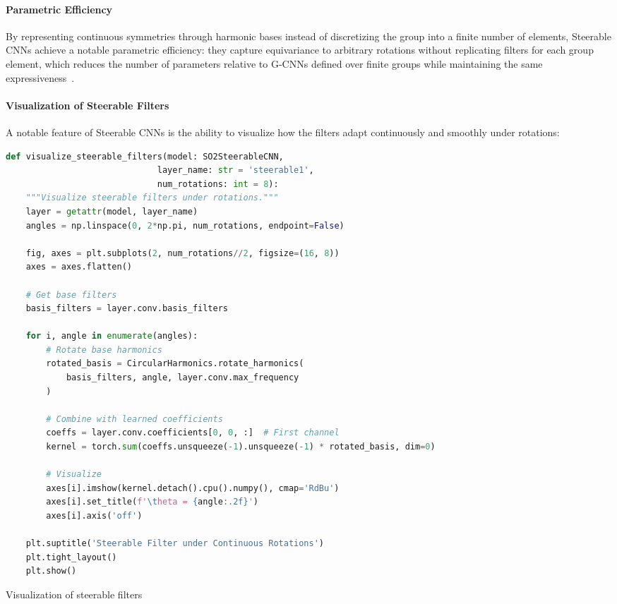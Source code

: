 \paragraph{Parametric Efficiency}

By representing continuous symmetries through harmonic bases instead of discretizing the group into a finite number of elements, Steerable CNNs achieve a notable parametric efficiency: they capture equivariance to arbitrary rotations without replicating filters for each group element, which reduces the number of parameters relative to G-CNNs defined over finite groups while maintaining the same expressiveness~\citep{weiler2019general}.

\paragraph{Visualization of Steerable Filters}

A notable feature of Steerable CNNs is the ability to visualize how the filters adapt continuously and smoothly under rotations:

\begin{listing}[h]
\begin{lstlisting}[language=Python]
def visualize_steerable_filters(model: SO2SteerableCNN,
                              layer_name: str = 'steerable1',
                              num_rotations: int = 8):
    """Visualize steerable filters under rotations."""
    layer = getattr(model, layer_name)
    angles = np.linspace(0, 2*np.pi, num_rotations, endpoint=False)

    fig, axes = plt.subplots(2, num_rotations//2, figsize=(16, 8))
    axes = axes.flatten()

    # Get base filters
    basis_filters = layer.conv.basis_filters

    for i, angle in enumerate(angles):
        # Rotate base harmonics
        rotated_basis = CircularHarmonics.rotate_harmonics(
            basis_filters, angle, layer.conv.max_frequency
        )

        # Combine with learned coefficients
        coeffs = layer.conv.coefficients[0, 0, :]  # First channel
        kernel = torch.sum(coeffs.unsqueeze(-1).unsqueeze(-1) * rotated_basis, dim=0)

        # Visualize
        axes[i].imshow(kernel.detach().cpu().numpy(), cmap='RdBu')
        axes[i].set_title(f'\theta = {angle:.2f}')
        axes[i].axis('off')

    plt.suptitle('Steerable Filter under Continuous Rotations')
    plt.tight_layout()
    plt.show()
\end{lstlisting}
\caption{Visualization of steerable filters}
\label{code:visualize_steerable}
\end{listing}

